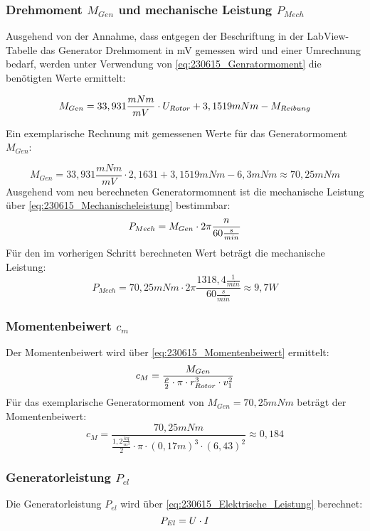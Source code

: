 \subsubsection*{Drehmoment $M_{Gen}$ und mechanische Leistung $P_{Mech}$}
Ausgehend von der Annahme,
 dass entgegen der Beschriftung in der LabView-Tabelle das Generator Drehmoment in mV gemessen wird und einer Umrechnung bedarf, 
 werden unter Verwendung von \autoref{eq:230615_Genratormoment} die benötigten Werte ermittelt:

\begin{equation}
    \centering
    M_{Gen} = 33,931\frac{mNm}{mV} \cdot U_{Rotor} + 3,1519 mNm - M_{Reibung}
    \label{eq:230615_Genratormoment}
\end{equation}

Ein exemplarische Rechnung mit gemessenen Werte für das Generatormoment $M_{Gen}$:

$$M_{Gen} = 33,931\frac{mNm}{mV} \cdot 2,1631 + 3,1519 mNm - 6,3mNm \approx 70,25 mNm$$
Ausgehend vom neu berechneten Generatormomnent ist die mechanische Leistung über \autoref{eq:230615_Mechanischeleistung} bestimmbar:
\begin{equation}
    \centering
    P_{Mech} = M_{Gen} \cdot 2 \pi \frac{n}{60\frac{s}{min}}
    \label{eq:230615_Mechanischeleistung}
\end{equation}
Für den im vorherigen Schritt berechneten Wert beträgt die mechanische Leistung: 
$$P_{Mech} = 70,25mNm \cdot 2 \pi \frac{1318,4 \frac{1}{min}}{60\frac{s}{min}} \approx 9,7W$$

\subsubsection*{Momentenbeiwert $c_m$}
Der Momentenbeiwert wird über \autoref{eq:230615_Momentenbeiwert} ermittelt:
\begin{equation}
    \centering
    c_M = \frac{M_{Gen}}{ \frac{\rho}{2} \cdot \pi \cdot r_{Rotor}^3 \cdot v_1^2}
    \label{eq:230615_Momentenbeiwert}
\end{equation}
Für das exemplarische Generatormoment von $M_{Gen} = 70,25mNm$ beträgt der Momentenbeiwert:
$$c_M = \frac{70,25mNm}{ \frac{1,2 \frac{kg}{m^3}}{2} \cdot \pi \cdot (0,17 m)^3 \cdot (6,43)^2}\approx 0,184$$

\subsubsection*{Generatorleistung $P_{el}$}
Die Generatorleistung $P_{el}$ wird über \autoref{eq:230615_Elektrische_Leistung} berechnet:
\begin{equation}
    \centering
    P_{El} = U \cdot I
    \label{eq:230615_Elektrische_Leistung}
\end{equation}

